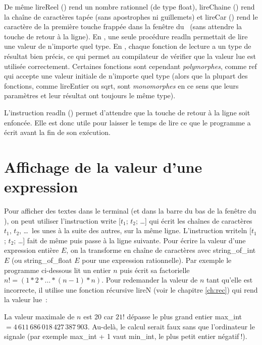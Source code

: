 De même {\idt lireReel ()} rend un nombre rationnel (de type {\idt float}), {\idt lireChaine ()}
rend la chaîne de caractères tapée (sans apostrophes ni guillemets) et {\idt lireCar ()} rend
le caractère de la première touche frappée dans la fenêtre du \robot\ (sans attendre la touche de
retour à la ligne). En \pascal, une seule procédure {\idt readln} permettait de lire une valeur
de n'importe quel type. En \ocaml, chaque fonction de lecture a un type de résultat bien précis, ce
qui permet au compilateur de vérifier que la valeur lue est utilisée correctement. Certaines
fonctions sont cependant {\em polymorphes}, comme {\idt ref} qui accepte
une valeur initiale de n'importe quel type (alors que la plupart des fonctions, comme
{\idt lireEntier} ou {\idt sqrt}, sont {\em monomorphes} en ce sens que leurs
paramètres et leur résultat ont toujours le même type).

L'instruction {\idt readln ()} permet d'attendre que la touche %
\framebox[11.mm][l]{$\hookleftarrow$~~~}\hspace{0.3ex}
de retour à la ligne soit enfoncée. Elle est donc utile pour laisser le temps de lire ce que
le programme a écrit avant la fin de son exécution.

\section{Affichage de la valeur d'une expression}
Pour afficher des textes dans le terminal (et dans la barre du bas de la fenêtre du
\robot), on
peut utiliser l'instruction {\idt write [}$t_1${\idt ;} $t_2${\idt ;} \ldots{\idt ]} qui écrit les chaînes de
caractères $t_1$, $t_2$, \ldots\ les unes
à la suite des autres, sur la même ligne. L'instruction
{\idt writeln [}$t_1${\idt ;} $t_2${\idt ;} \ldots{\idt ]} fait de même puis passe à la ligne suivante. Pour
écrire la valeur d'une expression entière $E$, on la transforme en chaîne de caractères
avec {\idt string\_of\_int} $E$ (ou {\idt string\_of\_float} $E$ pour une expression
rationnelle). Par exemple
le programme ci-dessous lit
un entier $n$
puis écrit sa factorielle $n! = (1 \ast 2 \ast \ldots \ast (n - 1) \ast n)$. Pour redemander
la valeur de $n$ tant qu'elle est incorrecte, il utilise une fonction récursive {\idt lireN}
(voir le chapitre \ref{ch:rec}) qui rend la valeur lue~:


\noindent La valeur maximale de $n$ est 20 car $21!$ dépasse le plus grand entier
{\idt max\_int} $= 4\,611\,686\,018\,427\,387\,903$. Au-delà, le calcul serait faux sans
que l'ordinateur le signale (par exemple {\idt max\_int + 1} vaut {\idt min\_int}, le plus petit
entier négatif$\:$!).


